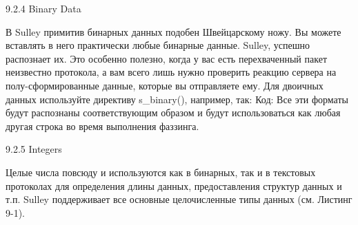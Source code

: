 \documentclass[12pt]{book}
\begin{document}
9.2.4 Binary Data

В Sulley примитив бинарных данных подобен Швейцарскому ножу. Вы можете вставлять в него практически любые бинарные данные. Sulley, успешно распознает их. Это особенно полезно, когда у вас есть перехваченный пакет неизвестно протокола, а вам всего лишь нужно проверить реакцию сервера на полу-сформированные данные, которые вы отправляете ему. Для двоичных данных используйте директиву s\_binary(), например, так:
Код:
Все эти форматы будут распознаны соответствующим образом и будут использоваться как любая другая строка во время выполнения фаззинга. 

9.2.5 Integers

Целые числа повсюду и используются как в бинарных, так и в текстовых протоколах для определения длины данных, предоставления структур данных и т.п. Sulley поддерживает все основные целочисленные типы данных (см. Листинг 9-1).
\end{document}
